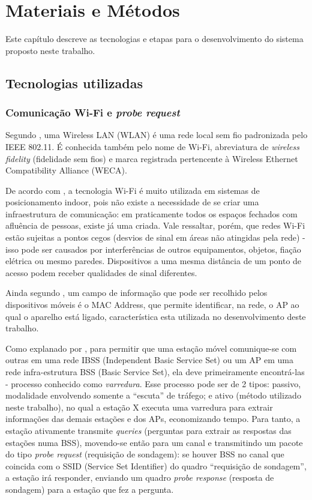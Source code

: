 
\chapter{Materiais e Métodos}
\label{metodologia}
Este capítulo descreve as tecnologias e etapas para o desenvolvimento
do sistema proposto neste trabalho.

\section{Tecnologias utilizadas}
\label{tecnologias-usadas}

\subsection{Comunicação Wi-Fi e \emph{probe request}}
\label{wifi}

Segundo , uma Wireless LAN (WLAN) é uma rede local sem
fio padronizada pelo IEEE 802.11. É conhecida também pelo nome de Wi-Fi,
abreviatura de \emph{wireless fidelity} (fidelidade sem fios) e marca registrada
pertencente à Wireless Ethernet Compatibility Alliance (WECA).

De acordo com , a tecnologia Wi-Fi é muito utilizada em
sistemas de posicionamento indoor, pois não existe a necessidade de se criar uma
infraestrutura de comunicação: em praticamente todos os espaços fechados com
afluência de pessoas, existe já uma criada. Vale ressaltar, porém, que redes
Wi-Fi estão sujeitas a pontos cegos (desvios de sinal em áreas não atingidas
pela rede) - isso pode ser causados por interferências de outros equipamentos,
objetos, fiação elétrica ou mesmo paredes. Dispositivos a uma mesma distância de
um ponto de acesso podem receber qualidades de sinal diferentes.

Ainda segundo , um campo de informação que pode ser
recolhido pelos dispositivos móveis é o MAC Address, que permite identificar, na
rede, o AP ao qual o aparelho está ligado, característica esta utilizada no
desenvolvimento deste trabalho.

Como explanado por , para permitir que uma estação móvel
comunique-se com outras em uma rede IBSS (Independent Basic Service Set) ou um
AP em uma rede infra-estrutura BSS (Basic Service Set), ela deve primeiramente
encontrá-las - processo conhecido como \emph{varredura}. Esse processo pode ser de 2
tipos: passivo, modalidade envolvendo somente a ``escuta'' de tráfego; e ativo
(método utilizado neste trabalho), no qual a estação X executa uma varredura
para extrair informações das demais estações e dos APs, economizando tempo.
Para tanto, a estação ativamente transmite \emph{queries} (perguntas para
extrair as respostas das estações numa BSS), movendo-se então para um canal e
transmitindo um pacote do tipo \emph{probe request} (requisição de sondagem): se
houver BSS no canal que coincida com o SSID (Service Set Identifier) do quadro
``requisição de sondagem'', a estação irá responder, enviando um quadro
\emph{probe response} (resposta de sondagem) para a estação que fez a pergunta.


